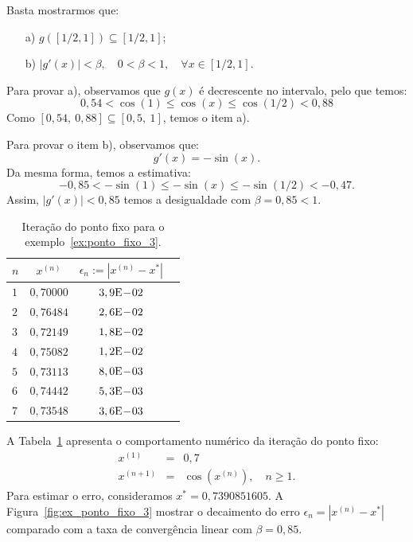 \begin{sol}
  Basta mostrarmos que:
  \begin{enumerate}
  \item[a)] $g\left([1/2,1]\right) \subseteq [1/2,1]$;
  \item[b)] $|g'(x)|<\beta, \quad 0<\beta<1,\quad \forall x\in [1/2,1]$.
  \end{enumerate}

Para provar a), observamos que $g(x)$ é decrescente no intervalo, pelo que temos:
\begin{equation*}
  0,54<\cos(1)\leq \cos(x)\leq \cos(1/2)<0,88
\end{equation*}
Como $[0,54,~0,88]\subseteq [0,5,~1]$, temos o item a).

Para provar o item b), observamos que:
\begin{equation*}
  g'(x) = -\sin(x).
\end{equation*}
Da mesma forma, temos a estimativa:
\begin{equation*}
  -0,85<-\sin(1) \leq -\sin(x)\leq -\sin(1/2)<-0,47.
\end{equation*}
Assim, $|g'(x)|<0,85$ temos a desigualdade com $\beta=0,85<1$.

\begin{table}
  \centering
  \begin{tabular}{l|ccc}\hline
   $n$ & $x^{(n)}$ & $\epsilon_n := |x^{(n)} - x^*|$ \\\hline
   $1$ & $0,70000$ & $3,9\mathrm{E}\!-\!02$ \\
   $2$ & $0,76484$ & $2,6\mathrm{E}\!-\!02$ \\
   $3$ & $0,72149$ & $1,8\mathrm{E}\!-\!02$ \\
   $4$ & $0,75082$ & $1,2\mathrm{E}\!-\!02$ \\
   $5$ & $0,73113$ & $8,0\mathrm{E}\!-\!03$ \\
   $6$ & $0,74442$ & $5,3\mathrm{E}\!-\!03$ \\
   $7$ & $0,73548$ & $3,6\mathrm{E}\!-\!03$ \\\hline
  \end{tabular}
  \caption{Iteração do ponto fixo para o exemplo~\ref{ex:ponto_fixo_3}.}
  \label{tab:ponto_fixo_3}
\end{table}


A Tabela~\ref{tab:ponto_fixo_3} apresenta o comportamento numérico da iteração do ponto fixo:
\begin{eqnarray*}
x^{(1)} &=& 0,7\\
x^{(n+1)} &=& \cos(x^{(n)}),\quad n\geq 1.
\end{eqnarray*}
Para estimar o erro, consideramos $x^* = 0,7390851605$. A Figura~\ref{fig:ex_ponto_fixo_3} mostrar o decaimento do erro $\epsilon_n = |x^{(n)} - x^*|$ comparado com a taxa de convergência linear com $\beta = 0,85$.


\end{sol}
